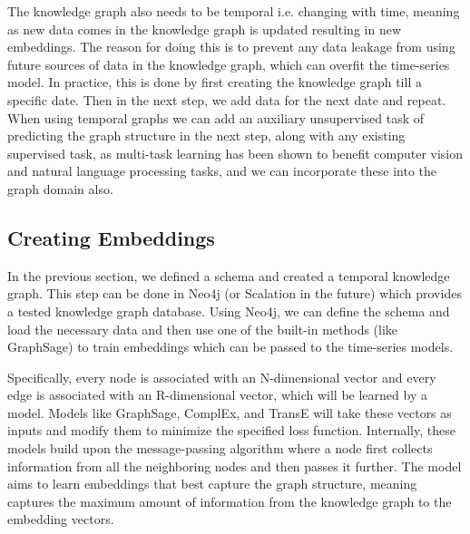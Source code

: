 \documentclass[11pt,twocolumn,letterpaper]{article}
\begin{document}
The knowledge graph also needs to be temporal i.e. changing with time, meaning as new data comes in the knowledge graph is updated resulting in new embeddings. The reason for doing this is to prevent any data leakage from using future sources of data in the knowledge graph, which can overfit the time-series model. In practice, this is done by first creating the knowledge graph till a specific date. Then in the next step, we add data for the next date and repeat. When using temporal graphs we can add an auxiliary unsupervised task of predicting the graph structure in the next step, along with any existing supervised task, as multi-task learning has been shown to benefit computer vision and natural language processing tasks, and we can incorporate these into the graph domain also.

\subsection{Creating Embeddings}
In the previous section, we defined a schema and created a temporal knowledge graph. This step can be done in Neo4j (or Scalation in the future) which provides a tested knowledge graph database. Using Neo4j, we can define the schema and load the necessary data and then use one of the built-in methods (like GraphSage) to train embeddings which can be passed to the time-series models.

Specifically, every node is associated with an N-dimensional vector and every edge is associated with an R-dimensional vector, which will be learned by a model. Models like GraphSage, ComplEx, and TransE will take these vectors as inputs and modify them to minimize the specified loss function. Internally, these models build upon the message-passing algorithm where a node first collects information from all the neighboring nodes and then passes it further. The model aims to learn embeddings that best capture the graph structure, meaning captures the maximum amount of information from the knowledge graph to the embedding vectors.
\end{document}
